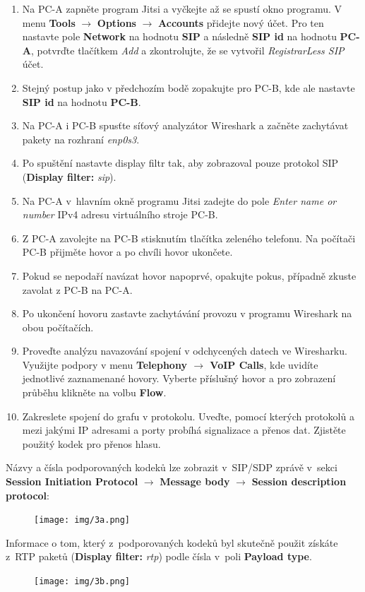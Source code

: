 \begin{enumerate}
    \item Na PC-A zapněte program Jitsi a vyčkejte až se spustí okno programu.
	V menu {\bf Tools} $\rightarrow$ {\bf Options} $\rightarrow$ {\bf Accounts} přidejte nový účet. Pro ten nastavte pole {\bf Network} na hodnotu {\bf SIP} a následně {\bf SIP id} na hodnotu {\bf PC-A}, potvrďte tlačítkem \emph{Add} a zkontrolujte, že se vytvořil {\it RegistrarLess SIP} účet.
    \item Stejný postup jako v předchozím bodě zopakujte pro PC-B, kde ale nastavte {\bf SIP id} na hodnotu {\bf PC-B}.
	\item Na PC-A i PC-B spusťte síťový analyzátor Wireshark a začněte zachytávat pakety na rozhraní \emph{enp0s3}.
    \item Po spuštění nastavte display filtr tak, aby zobrazoval pouze protokol SIP (\textbf{Display filter:} \emph{sip}).
    \item Na PC-A v hlavním okně programu Jitsi zadejte do pole {\it Enter name or number} IPv4 adresu virtuálního stroje PC-B.
    \item Z PC-A zavolejte na PC-B stisknutím tlačítka zeleného telefonu. Na počítači PC-B přijměte hovor a po chvíli hovor ukončete.
	\item Pokud se nepodaří navázat hovor napoprvé, opakujte pokus, případně zkuste zavolat z PC-B na PC-A.
	\item Po ukončení hovoru zastavte zachytávání provozu v programu Wireshark na obou počítačích.
    \item Proveďte analýzu navazování spojení v odchycených datech ve Wiresharku. Využijte podpory v menu {\bf Telephony $\rightarrow$ VoIP Calls}, kde uvidíte jednotlivé zaznamenané hovory. Vyberte příslušný hovor a pro zobrazení průběhu klikněte na volbu {\bf Flow}.
    \item Zakreslete spojení do grafu v protokolu. Uveďte, pomocí kterých protokolů a mezi jakými IP adresami a porty probíhá signalizace a přenos dat. Zjistěte použitý kodek pro přenos hlasu.
\end{enumerate}
Názvy a čísla podporovaných kodeků lze zobrazit v SIP/SDP zprávě v sekci {\bf Session Initiation Protocol} $\rightarrow$ {\bf Message body} $\rightarrow$ {\bf Session description protocol}:
\begin{figure}[h!]
  \centering
  \texttt{[image: img/3a.png]}
\end{figure}

\noindent Informace o tom, který z podporovaných kodeků byl skutečně použit získáte z RTP paketů (\textbf{Display filter:} \emph{rtp}) podle čísla v poli {\bf Payload type}.
\begin{figure}[h!]
  \centering
  \texttt{[image: img/3b.png]}
\end{figure}


